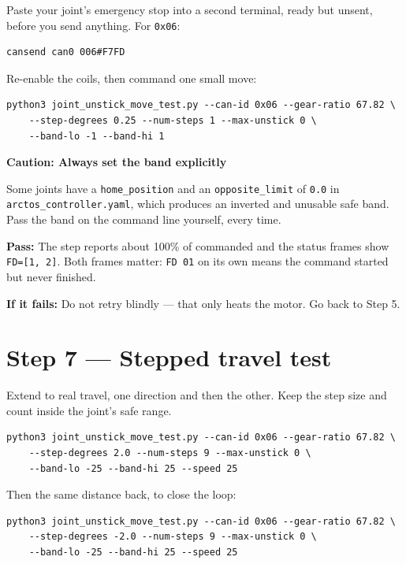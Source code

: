 \documentclass[11pt,letterpaper]{article}
\newenvironment{caution}[1]{%
    \par\addvspace{8pt}%
    \noindent{\color{cautionred}\rule{\linewidth}{0.8pt}}\par\vspace{2pt}
    \noindent\textbf{\color{cautionred}Caution: #1}\par\vspace{2pt}
}{%
    \par\vspace{2pt}\noindent{\color{cautionred}\rule{\linewidth}{0.4pt}}%
    \par\addvspace{8pt}%
}
\newcommand{\passif}[1]{\par\vspace{2pt}\noindent\textbf{\color{okgreen}Pass:} #1\par\vspace{4pt}}
\newcommand{\failif}[1]{\noindent\textbf{If it fails:} #1\par\vspace{6pt}}
\begin{document}
Paste your joint's emergency stop into a second terminal, ready but unsent, before
you send anything. For \texttt{0x06}:

\begin{lstlisting}
cansend can0 006#F7FD
\end{lstlisting}

Re-enable the coils, then command one small move:

\begin{lstlisting}
python3 joint_unstick_move_test.py --can-id 0x06 --gear-ratio 67.82 \
    --step-degrees 0.25 --num-steps 1 --max-unstick 0 \
    --band-lo -1 --band-hi 1
\end{lstlisting}

\begin{caution}{Always set the band explicitly}
Some joints have a \texttt{home\_position} and an \texttt{opposite\_limit} of
\texttt{0.0} in \texttt{arctos\_controller.yaml}, which produces an inverted and
unusable safe band. Pass the band on the command line yourself, every time.
\end{caution}

\passif{The step reports about 100\% of commanded and the status frames show
\texttt{FD=[1, 2]}. Both frames matter: \texttt{FD 01} on its own means the command
started but never finished.}
\failif{Do not retry blindly --- that only heats the motor. Go back to Step 5.}

\section*{Step 7 --- Stepped travel test}

Extend to real travel, one direction and then the other. Keep the step size and
count inside the joint's safe range.

\begin{lstlisting}
python3 joint_unstick_move_test.py --can-id 0x06 --gear-ratio 67.82 \
    --step-degrees 2.0 --num-steps 9 --max-unstick 0 \
    --band-lo -25 --band-hi 25 --speed 25
\end{lstlisting}

Then the same distance back, to close the loop:

\begin{lstlisting}
python3 joint_unstick_move_test.py --can-id 0x06 --gear-ratio 67.82 \
    --step-degrees -2.0 --num-steps 9 --max-unstick 0 \
    --band-lo -25 --band-hi 25 --speed 25
\end{lstlisting}
\end{document}
